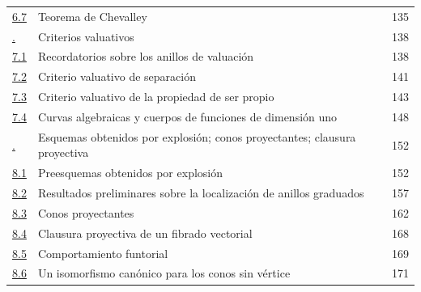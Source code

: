 \documentclass[oneside,10pt]{amsart}
\newcommand{\oldpage}[2][]{\marginnote{\normalfont\footnotesize\textbf{#1}~|~#2}\ignorespaces}
\begin{document}
\begin{longtable}{@{}p{}p{}r@{}}
\hyperref[subsection:II.6.7]{6.7} & Teorema de Chevalley & 135\\
\hyperref[section:II.7]{\textsection7.} & Criterios valuativos & 138\\
\hyperref[subsection:II.7.1]{7.1} & Recordatorios sobre los anillos de valuación & 138\\
\hyperref[subsection:II.7.2]{7.2} & Criterio valuativo de separación & 141\\
\hyperref[subsection:II.7.3]{7.3} & Criterio valuativo de la propiedad de ser propio & 143\\
\hyperref[subsection:II.7.4]{7.4} & Curvas algebraicas y cuerpos de funciones de dimensión uno & 148\\
\hyperref[section:II.8]{\textsection8.} & Esquemas obtenidos por explosión; conos proyectantes; clausura proyectiva & 152\\
\hyperref[subsection:II.8.1]{8.1} & Preesquemas obtenidos por explosión & 152\\
\hyperref[subsection:II.8.2]{8.2} & Resultados preliminares sobre la localización de anillos graduados & 157\\
\hyperref[subsection:II.8.3]{8.3} & Conos proyectantes & 162\\
\hyperref[subsection:II.8.4]{8.4} & Clausura proyectiva de un fibrado vectorial & 168\\
\hyperref[subsection:II.8.5]{8.5} & Comportamiento funtorial & 169\\
\hyperref[subsection:II.8.6]{8.6} & Un isomorfismo canónico para los conos sin vértice & 171\\
\end{longtable}
\oldpage[II]{215}
\end{document}
